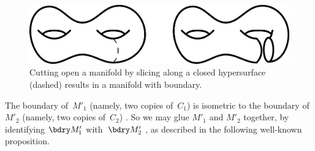 \begin{figure}[ht]
 \includegraphics{PDF/cutopen.jpg}
 \caption{Cutting open a manifold by slicing along a closed
hypersurface (dashed) results in a manifold with boundary.}
 \label{cutopen}
 \end{figure}
%
%
%
%
%
%
%


The boundary of~$M'_1$
(namely, two copies of~$C_1$) is isometric to the boundary
of~$M'_2$ (namely, two copies of~$C_2$)
. So we may glue $M'_1$ and $M'_2$
together, by identifying $\bdry M'_1$ with~$\bdry M'_2$
, as described in the following
well-known proposition.


